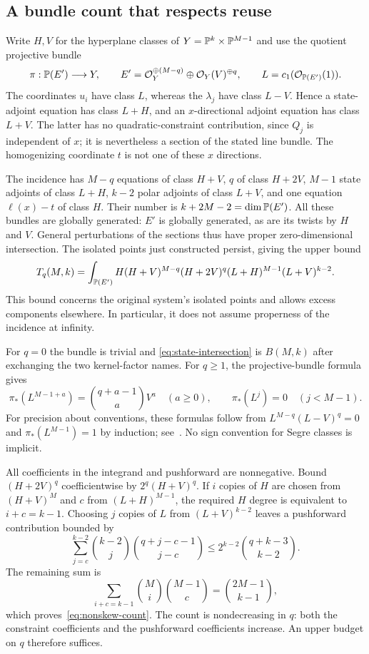 \subsection*{A bundle count that respects reuse}

Write $H,V$ for the hyperplane classes of
$Y=\mathbb P^k\times\mathbb P^{M-1}$ and use the quotient projective bundle
\[
 \pi:\mathbb P(E')\longrightarrow Y,\qquad
 E'=\mathcal O_Y^{\oplus(M-q)}\oplus
       \mathcal O_Y(V)^{\oplus q},\qquad
 L=c_1(\mathcal O_{\mathbb P(E')}(1)).
\]
The coordinates $u_i$ have class $L$, whereas the $\lambda_j$ have
class $L-V$. Hence a state-adjoint equation has class $L+H$, and an
$x$-directional adjoint equation has class $L+V$. The latter has no
quadratic-constraint contribution, since $Q_j$ is independent of $x$;
it is nevertheless a section of the stated line bundle. The
homogenizing coordinate $t$ is not one of these $x$ directions.

The incidence has $M-q$ equations of class $H+V$, $q$ of class
$H+2V$, $M-1$ state adjoints of class $L+H$, $k-2$ polar adjoints of
class $L+V$, and one equation $\ell(x)-t$ of class $H$. Their number
is $k+2M-2=\dim\mathbb P(E')$. All these bundles are globally generated:
$E'$ is globally generated, as are its twists by $H$ and $V$.
General perturbations of the sections thus have proper
zero-dimensional intersection. The isolated points just constructed
persist, giving the upper bound
\begin{equation}\label{eq:state-intersection}
 T_q(M,k)=\int_{\mathbb P(E')}
 H(H+V)^{M-q}(H+2V)^q(L+H)^{M-1}(L+V)^{k-2}.
\end{equation}
This bound concerns the original system's isolated points and allows
excess components elsewhere. In particular, it does not assume
properness of the incidence at infinity.

For $q=0$ the bundle is trivial and
\eqref{eq:state-intersection} is $B(M,k)$ after exchanging the two
kernel-factor names. For $q\ge1$, the projective-bundle formula gives
\[
 \pi_*(L^{M-1+a})=\binom{q+a-1}{a}V^a\quad(a\ge0),\qquad
 \pi_*(L^j)=0\quad(j<M-1).
\]
For precision about conventions, these formulas follow from
$L^{M-q}(L-V)^q=0$ and $\pi_*(L^{M-1})=1$ by induction;
see~\cite[Sections 27.21 and 42.36]{Stacks}. No sign convention for
Segre classes is implicit.

All coefficients in the integrand and pushforward are nonnegative.
Bound $(H+2V)^q$ coefficientwise by $2^q(H+V)^q$. If $i$ copies
of $H$ are chosen from $(H+V)^M$ and $c$ from $(L+H)^{M-1}$, the
required $H$ degree is equivalent to $i+c=k-1$. Choosing $j$ copies
of $L$ from $(L+V)^{k-2}$ leaves a pushforward contribution bounded by
\[
 \sum_{j=c}^{k-2}\binom{k-2}{j}\binom{q+j-c-1}{j-c}
 \le 2^{k-2}\binom{q+k-3}{k-2}.
\]
The remaining sum is
\[
 \sum_{i+c=k-1}\binom Mi\binom{M-1}c
 =\binom{2M-1}{k-1},
\]
which proves~\eqref{eq:nonskew-count}. The count is nondecreasing
in $q$: both the constraint coefficients and the pushforward
coefficients increase. An upper budget on $q$ therefore suffices.

